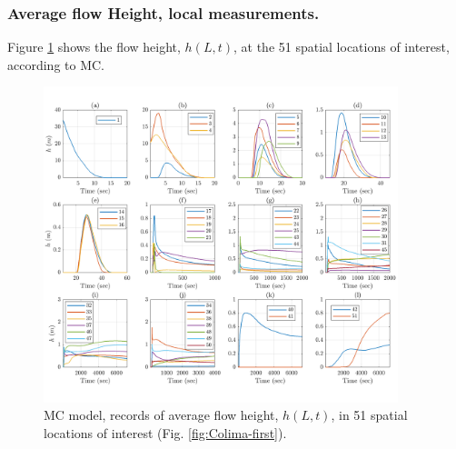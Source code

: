 \documentclass{article}
\begin{document}
\subsubsection{Average flow Height, local measurements.}
Figure \ref{fig:BAF-H-MC} shows the flow height, $h(L,t)$, at the 51 spatial locations of interest, according to MC.
\begin{figure}[H]
         \centering
        \includegraphics[width=0.92\textwidth]{MC&VS_51/Height_MC2.png}
        \caption{MC model, records of average flow height, $h(L,t)$, in 51 spatial locations of interest (Fig. \ref{fig:Colima-first}).}
        \label{fig:BAF-H-MC}
\end{figure}
\end{document}
